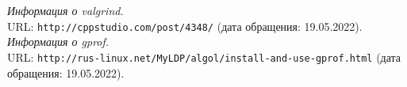 \begin{thebibliography}{2}
{\itshape Информация о valgrind.} \\URL: \texttt{http://cppstudio.com/post/4348/} (дата обращения: 19.05.2022).
{\itshape Информация о gprof.} \\URL: \texttt{http://rus-linux.net/MyLDP/algol/install-and-use-gprof.html} (дата обращения: 19.05.2022).
\end{thebibliography}
\pagebreak



